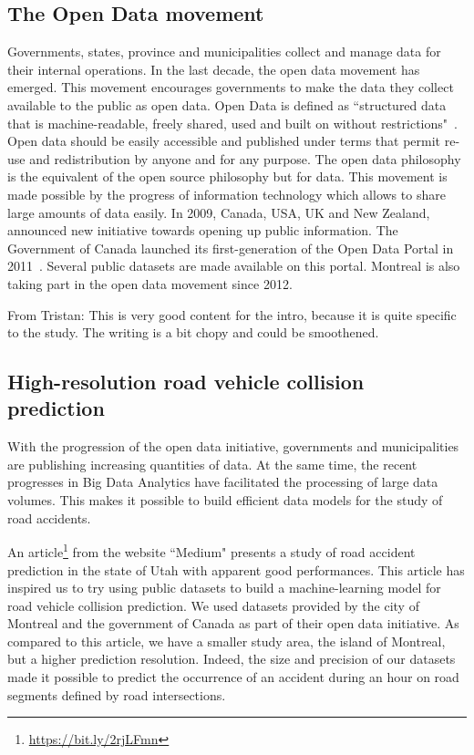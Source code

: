 \documentclass[conference]{IEEEtran}
\newcommand{\TG}[1]{\colorlet{saved}{.}\color{orange}From Tristan: #1\color{saved}}
\begin{document}
\subsection{The Open Data movement}

Governments, states, province and municipalities collect and manage data for their internal operations. In the last decade, the open data movement has emerged. This movement encourages governments to make the data they collect available to the public as open data.
Open Data is defined as ``structured data that is machine-readable, freely shared, used and built on without restrictions"~\cite{opendata101}. Open data should be easily accessible and published under terms that permit re-use and redistribution by anyone and for any purpose.
The open data philosophy is the equivalent of the open source philosophy but for data.
This movement is made possible by the progress of information technology which allows to share large amounts of data easily. In 2009, Canada, USA, UK and New Zealand, announced new initiative towards opening up public information. The Government of Canada launched its first-generation of the Open Data Portal in 2011~\cite{opendata101}. Several public datasets are made available on this portal. Montreal is also taking part in the open data movement since 2012.

\TG{This is very good content for the intro, because it is quite specific to the study. The writing is a bit chopy and could be smoothened.}

\subsection{High-resolution road vehicle collision prediction}
With the progression of the open data initiative, governments and municipalities are publishing increasing quantities of data. At the same time, the recent progresses in Big Data Analytics have facilitated the processing of large data volumes. This makes it possible to build efficient data models for the study of road accidents.

An article\protect\footnote{\url{https://bit.ly/2rjLFmn}} from the website ``Medium" presents a study of road accident prediction in the state of Utah with apparent good performances. This article has inspired us to try using public datasets to build a machine-learning model for road vehicle collision prediction. We used datasets provided by the city of Montreal and the government of Canada as part of their open data initiative. As compared to this article, we have a smaller study area, the island of Montreal, but a higher prediction resolution. Indeed, the size and precision of our datasets made it possible to predict the occurrence of an accident during an hour on road segments defined by road intersections.
\end{document}
